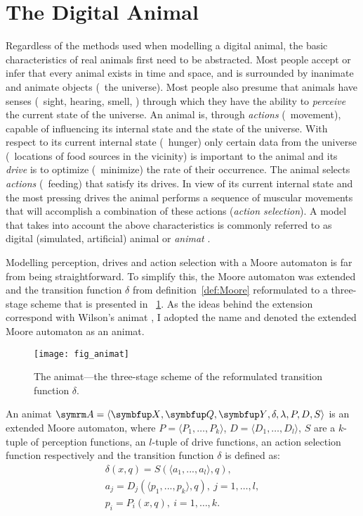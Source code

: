 \section{The Digital Animal}
\label{sec:animat}
Regardless of the methods used when modelling a digital animal, the basic characteristics of real animals first need to be abstracted. Most people accept or infer that every animal exists in time and space, and is surrounded by inanimate and animate objects (\ie\ the universe). Most people also presume that animals have senses (\ie\ sight, hearing, smell, \etc) through which they have the ability to \emph{perceive} the current state of the universe. An animal is, through \emph{actions} (\eg\ movement), capable of influencing its internal state and the state of the universe. With respect to its current internal state (\eg\ hunger) only certain data from the universe (\eg\ locations of food sources in the vicinity) is important to the animal and its \emph{drive} is to optimize (\eg\ minimize) the rate of their occurrence. The animal selects \emph{actions} (\eg\ feeding) that satisfy its drives. In view of its current internal state and the most pressing drives the animal performs a sequence of muscular movements that will accomplish a combination of these actions (\emph{action selection}). A model that takes into account the above characteristics is commonly referred to as digital (simulated, artificial) animal or \emph{animat} \cite{cliff:1993,watts:1998,wilson:1985}.

Modelling perception, drives and action selection with a Moore automaton is far from being straightforward. To simplify this, the Moore automaton was extended  \cite{lebar_bajec:2002,lebar_bajec:2003a,lebar_bajec:2003b} and the transition function $\delta$ from definition~\ref{def:Moore} reformulated to a three-stage scheme that is presented in \fig~\ref{fig:animat}. As the ideas behind the extension correspond with Wilson's animat \cite{wilson:1985}, I adopted the name and denoted the extended Moore automaton as an animat. 

\begin{figure}
	\texttt{[image: fig\_animat]}
	\caption{The animat---the three-stage scheme of the reformulated transition function $\delta$.}
	\label{fig:animat}
\end{figure}

\begin{definition}
	\label{def:animat}
	An animat $\autom{A}=\langle\set{X},\set{Q},\set{Y},\delta,\lambda,P,D,S\rangle$ is an extended Moore automaton, where $P=\langle P_1,\ldots,P_k\rangle$, $D=\langle D_1,\ldots,D_l\rangle$, $S$ are a $k$-tuple of perception functions, an $l$-tuple of drive functions, an action selection function respectively and the transition function $\delta$ is defined as:
	\begin{eqnarray}
		& \delta(x,q) = S(\langle a_1,...,a_l\rangle,q), & \label{eq:animat:delta}\\
		& a_j = D_j(\langle p_1,...,p_k\rangle,q),\ j=1,\ldots,l, & \\
		& p_i = P_i(x,q),\ i=1,\ldots,k. & \label{eq:animat:Pi}
	\end{eqnarray}
\end{definition}

